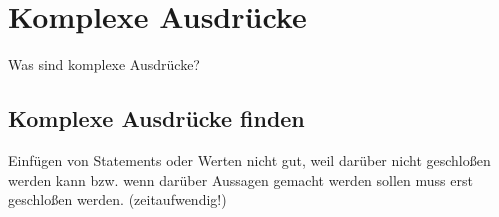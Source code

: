 \section{Komplexe Ausdrücke}
Was sind komplexe Ausdrücke?
\subsection{Komplexe Ausdrücke finden}
Einfügen von Statements oder Werten nicht gut, weil darüber nicht geschloßen werden kann bzw. wenn darüber Aussagen gemacht werden sollen muss erst geschloßen werden. (zeitaufwendig!)